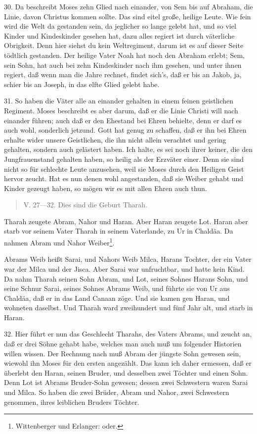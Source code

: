 30. Da beschreibt Moses zehn Glied nach einander, von Sem bis auf Abraham, die Linie, davon Christus kommen sollte. Das sind eitel große, heilige Leute. Wie fein wird die Welt da gestanden sein, da jeglicher so lange gelebt hat, und so viel Kinder und Kindeskinder gesehen hat, dazu alles regiert ist durch väterliche Obrigkeit. Denn hier siehst du kein Weltregiment, darum ist es auf dieser Seite tödtlich gestanden. Der heilige Vater Noah hat noch den Abraham erlebt; Sem, sein Sohn, hat auch bei zehn Kindeskinder nach ihm gesehen, und unter ihnen regiert, daß wenn man die Jahre rechnet, findet sich’s, daß er bis an Jakob, ja, schier bis an Joseph, in das elfte Glied gelebt habe.

31. So haben die Väter alle an einander gehalten in einem feinen geistlichen Regiment. Moses beschreibt es aber darum, daß er die Linie Christi will nach einander führen; auch daß er den Ehestand bei Ehren behielte, denn er darf es auch wohl, sonderlich jetzund. Gott hat genug zu schaffen, daß er ihn bei Ehren erhalte wider unsere Geistlichen, die ihn nicht allein verachtet und gering gehalten, sondern auch gelästert haben. Ich halte, es sei noch ihrer keiner, die den Jungfrauenstand gehalten haben, so heilig als der Erzväter einer. Denn sie sind nicht so für schlechte Leute anzusehen, weil sie Moses durch den Heiligen Geist hervor zeucht. Hat es nun denen wohl angestanden, daß sie Weiber gehabt und Kinder gezeugt haben, so mögen wir es mit allen Ehren auch thun.

\begin{quote}
V. 27—32. Dies sind die Geburt Tharah.
\end{quote}

Tharah zeugete Abram, Nahor und Haran. Aber Haran zeugete Lot. Haran aber starb vor seinem Vater Tharah in seinem Vaterlande, zu Ur in Chaldäa. Da nahmen Abram und Nahor
Weiber\footnote{Wittenberger und Erlanger: oder.}.

Abrams Weib heißt Sarai, und Nahors Weib Milca, Harans Tochter, der ein Vater war der Milca und der Jisca. Aber Sarai war unfruchtbar, und hatte kein Kind. Da nahm Tharah seinen Sohn Abram, und Lot, seines Sohnes Harans Sohn, und seine Schnur Sarai, seines Sohnes Abrams Weib, und führte sie von Ur aus Chaldäa, daß er in das Land Canaan zöge. Und sie kamen gen Haran, und wohneten daselbst. Und Tharah ward zweihundert und fünf Jahr alt, und starb in Haran.

32. Hier führt er nun das Geschlecht Tharahs, des Vaters Abrams, und zeucht an, daß er drei Söhne gehabt habe, welches man auch muß um folgender Historien willen wissen. Der Rechnung nach muß Abram der jüngste Sohn gewesen sein, wiewohl ihn Moses für den ersten angezählt. Das kann ich daher ermessen, daß er überlebt den Haran, seinen Bruder, und desselben zwei Töchter und einen Sohn. Denn Lot ist Abrams Bruder-Sohn gewesen; dessen zwei Schwestern waren Sarai und Milca. So haben die zwei Brüder, Abram und Nahor, zwei Schwestern genommen, ihres leiblichen Bruders Töchter.

